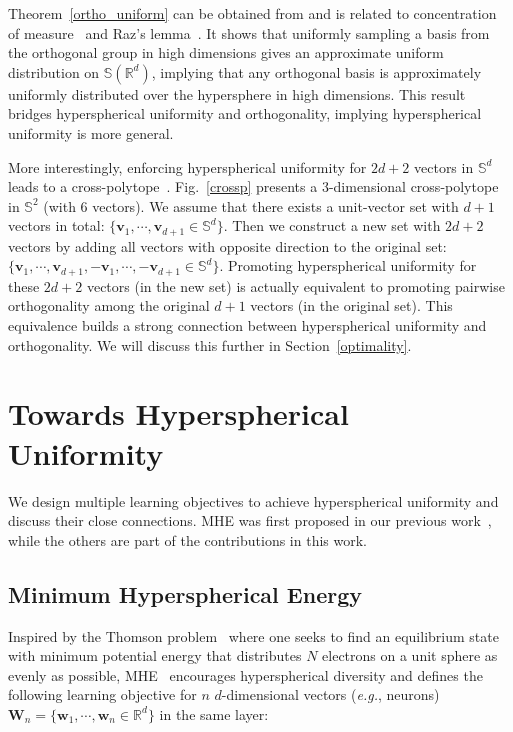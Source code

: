 Theorem~\ref{ortho_uniform} can be obtained from \cite{goldstein2014any} and is related to concentration of measure~\cite{milman2009asymptotic} and Raz's lemma~\cite{raz1999exponential}. It shows that uniformly sampling a basis from the orthogonal group in high dimensions gives an approximate uniform distribution on $\mathbb{S}(\mathbb{R}^d)$, implying that any orthogonal basis is approximately uniformly distributed over the hypersphere in high dimensions. This result bridges hyperspherical uniformity and orthogonality, implying hyperspherical uniformity is more general.

More interestingly, enforcing hyperspherical uniformity for $2d+2$ vectors in $\mathbb{S}^d$ leads to a cross-polytope~\cite{yudin1992minimum}. Fig.~\ref{crossp} presents a 3-dimensional cross-polytope in $\mathbb{S}^2$ (with 6 vectors). We assume that there exists a unit-vector set with $d+1$ vectors in total: $\{\bm{v}_1,\cdots,\bm{v}_{d+1}\in\mathbb{S}^{d}\}$. Then we construct a new set with $2d+2$ vectors by adding all vectors with opposite direction to the original set: $\{\bm{v}_1,\cdots,\bm{v}_{d+1},-\bm{v}_1,\cdots,-\bm{v}_{d+1}\in\mathbb{S}^{d}\}$. Promoting hyperspherical uniformity for these $2d+2$ vectors (in the new set) is actually equivalent to promoting pairwise orthogonality among the original $d+1$ vectors (in the original set). This equivalence builds a strong connection between hyperspherical uniformity and orthogonality. We will discuss this further in Section~\ref{optimality}.

\section{Towards Hyperspherical Uniformity}

We design multiple learning objectives to achieve hyperspherical uniformity and discuss their close connections. MHE was first proposed in our previous work~\cite{liu2018learning}, while the others are part of the contributions in this work.

\subsection{Minimum Hyperspherical Energy}

Inspired by the Thomson problem~\cite{thomson1904xxiv} where one seeks to find an equilibrium state with minimum potential energy that distributes $N$ electrons on a unit sphere as evenly as possible, MHE~\cite{liu2018learning,Lin20CoMHE} encourages hyperspherical diversity and defines the following learning objective for $n$ $d$-dimensional vectors (\emph{e.g.}, neurons)  $\bm{W}_n=\{\bm{w}_1,\cdots,\bm{w}_n\in\mathbb{R}^{d}\}$ in the same layer:

